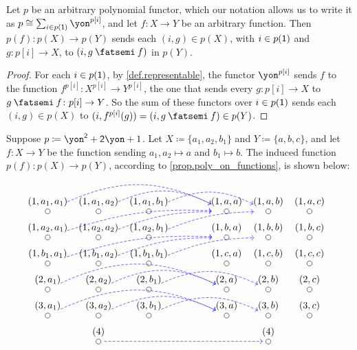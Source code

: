 \documentclass[Book-Poly]{subfiles}
\begin{document}
\begin{proposition} \label{prop.poly_on_functions}
Let $p$ be an arbitrary polynomial functor, which our notation allows us to write it as $p\iso\sum_{i\in p(\1)} \yon^{p[i]}$, and let $f\colon X\to Y$ be an arbitrary function.
Then $p(f)\colon p(X)\to p(Y)$ sends each $(i, g)\in p(X)$, with $i\in p(\textsf{1})$ and $g\colon p[i]\to X$, to $(i, g\then f)$ in $p(Y)$.
\end{proposition}
\begin{proof}
For each $i\in p(\textsf{1})$, by \cref{def.representable}, the functor $\yon^{p[i]}$ sends $f$ to the function $f^{p[i]}\colon X^{p[i]}\to Y^{p[i]}$, the one that sends every $g\colon p[i]\to X$ to $g\then f\colon p[i]\to Y$.
So the sum of these functors over $i\in p(\textsf{1})$ sends each $(i, g)\in p(X)$ to $(i, f^{p[i]}(g)) = (i, g\then f)\in p(Y)$.
\end{proof}

\begin{example}
Suppose $p\coloneqq\yon^\2+\2\yon+1$. Let $X\coloneqq\{a_1,a_2,b_1\}$ and $Y\coloneqq\{a,b,c\}$, and let $f\colon X\to Y$ be the function sending $a_1,a_2\mapsto a$ and $b_1\mapsto b$. The induced function $p(f)\colon p(X)\to p(Y)$, according to \cref{prop.poly_on_functions}, is shown below:
\[
\begin{tikzcd}[row sep=2pt, column sep=3pt, shorten <=-5pt, shorten >=-5pt, dashed]
\LMO{(1,a_1,a_1)}\ar[rrrr, blue, bend left=25pt]&\LMO{(1,a_1,a_2)}\ar[rrr, blue, bend left=25pt]&\LMO{(1,a_1,b_1)}\ar[rrr, blue, bend left=25pt]&[30pt]&
\LMO{(1,a,a)}&\LMO{(1,a,b)}&\LMO{(1,a,c)}&&
\\
\LMO{(1,a_2,a_1)}\ar[rrrru, blue, bend left=10pt]&\LMO{(1,a_2,a_2)}\ar[rrru, blue, bend left=10pt]&\LMO{(1,a_2,b_1)}\ar[rrru, blue, bend left=10pt]&&
\LMO{(1,b,a)}&\LMO{(1,b,b)}&\LMO{(1,b,c)}&&
\\
\LMO{(1,b_1,a_1)}\ar[rrrru, blue, bend left=10pt]&\LMO{(1,b_1,a_2)}\ar[rrru, blue, bend left=10pt]&\LMO{(1,b_1,b_1)}\ar[rrru, blue, bend left=10pt]&&
\LMO{(1,c,a)}&\LMO{(1,c,b)}&\LMO{(1,c,c)}&&
\\
\LMO{(2,a_1)}\ar[rrrr, blue, bend left=25pt]&\LMO{(2,a_2)}\ar[rrr, blue, bend left=25pt]&\LMO{(2,b_1)}\ar[rrr, blue, bend left=25pt]&&
\LMO{(2,a)}&\LMO{(2,b)}&\LMO{(2,c)}&&
\\
\LMO{(3,a_1)}\ar[rrrr, blue, bend left=25pt]&\LMO{(3,a_2)}\ar[rrr, blue, bend left=25pt]&\LMO{(3,b_1)}\ar[rrr, blue, bend left=25pt]&&
\LMO{(3,a)}&\LMO{(3,b)}&\LMO{(3,c)}&&
\\&
\LMO{(4)}\ar[rrrr, blue]&&&&\LMO{(4)}
\end{tikzcd}
\]
\end{example}
\end{document}
